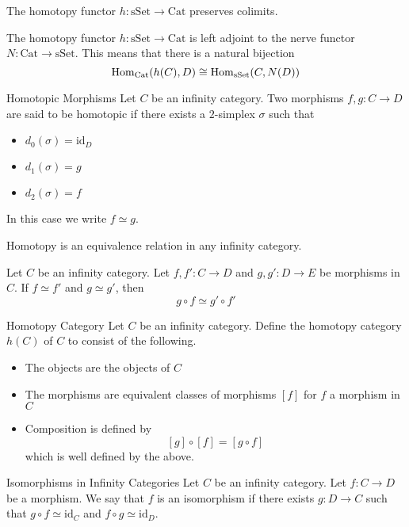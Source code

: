 \documentclass[a4paper]{article}
\begin{document}
\begin{prp}{}{} The homotopy functor $h:\text{sSet}\to\text{Cat}$ preserves colimits. 
\end{prp}

\begin{thm}{}{} The homotopy functor $h:\text{sSet}\to\text{Cat}$ is left adjoint to the nerve functor $N:\text{Cat}\to\text{sSet}$. This means that there is a natural bijection $$\operatorname{Hom}_\text{Cat}(h(C),D)\cong\operatorname{Hom}_\text{sSet}(C,N(D))$$
\end{thm}

\begin{defn}{Homotopic Morphisms}{} Let $C$ be an infinity category. Two morphisms $f,g:C\to D$ are said to be homotopic if there exists a $2$-simplex $\sigma$ such that 
\begin{itemize}
\item $d_0(\sigma)=\text{id}_D$
\item $d_1(\sigma)=g$
\item $d_2(\sigma)=f$
\end{itemize}
In this case we write $f\simeq g$. 
\end{defn}

\begin{lmm}{}{} Homotopy is an equivalence relation in any infinity category. 
\end{lmm}

\begin{prp}{}{} Let $C$ be an infinity category. Let $f,f':C\to D$ and $g,g':D\to E$ be morphisms in $C$. If $f\simeq f'$ and $g\simeq g'$, then $$g\circ f\simeq g'\circ f'$$
\end{prp}

\begin{defn}{Homotopy Category}{} Let $C$ be an infinity category. Define the homotopy category $h(C)$ of $C$ to consist of the following. 
\begin{itemize}
\item The objects are the objects of $C$
\item The morphisms are equivalent classes of morphisms $[f]$ for $f$ a morphism in $C$
\item Composition is defined by $$[g]\circ[f]=[g\circ f]$$ which is well defined by the above. 
\end{itemize}
\end{defn}

\begin{defn}{Isomorphisms in Infinity Categories}{} Let $C$ be an infinity category. Let $f:C\to D$ be a morphism. We say that $f$ is an isomorphism if there exists $g:D\to C$ such that $g\circ f\simeq\text{id}_C$ and $f\circ g\simeq\text{id}_D$. 
\end{defn}
\end{document}
